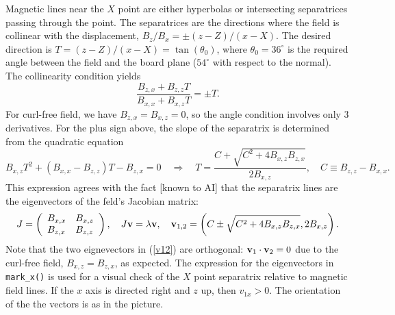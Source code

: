 \documentclass[10pt]{article}
\newcommand{\bfv}{{\bf v}}
\begin{document}
Magnetic lines near the $X$ point are either hyperbolas or
intersecting separatrices passing through the point.  The separatrices
are the directions where the field is collinear with the displacement,
$B_z/B_x = \pm(z-Z)/(x-X)$.  The desired direction is
$T=(z-Z)/(x-X)=\tan(\theta_0)$, where $\theta_0=36^\circ$ is the
required angle between the field and the board plane ($54^\circ$ with
respect to the normal).  The collinearity condition yields
\begin{equation}
\frac{B_{z,x} + B_{z,z}T}{B_{x,x}+B_{x,z}T} = \pm T.
\end{equation}
For curl-free field, we have $B_{z,x} = B_{x,z}=0$, so the angle
condition involves only 3 derivatives.  For the plus sign above, the
slope of the separatrix is determined from the quadratic equation
\begin{equation}
B_{x,z}T^2 + (B_{x,x} - B_{z,z})T - B_{z,x} = 0\quad\Longrightarrow\quad
T=\frac{C+\sqrt{C^2+4B_{x,z}B_{z,x}}}{2B_{x,z}},\quad C\equiv B_{z,z}-B_{x,x}.
\end{equation}
This expression agrees with the fact [known to AI] that the separatrix
lines are the eigenvectors of the feld's Jacobian matrix:
\begin{equation}
J=\left(\begin{array}{ll} B_{x,x} & B_{x,z}\\ B_{z,x} & B_{z,z}\end{array}\right),\quad J\bfv=\lambda\bfv,\quad
\bfv_{1,2}=\left(C\pm\sqrt{C^2+4B_{x,z}B_{z,x}}, 2B_{x,z}\right).
\label{v12}
\end{equation}
Note that the two eignevectors in (\ref{v12}) are orthogonal:
$\bfv_1\cdot\bfv_2=0$ due to the curl-free field, $B_{x,z}=B_{z,x}$,
as expected.  The expression for the eigenvectors in {\tt mark\_x()}
is used for a visual check of the $X$ point separatrix relative to
magnetic field lines.  If the $x$ axis is directed right and $z$ up,
then $v_{1x}>0$.  The orientation of the the vectors is as in the picture.
%
\end{document}

